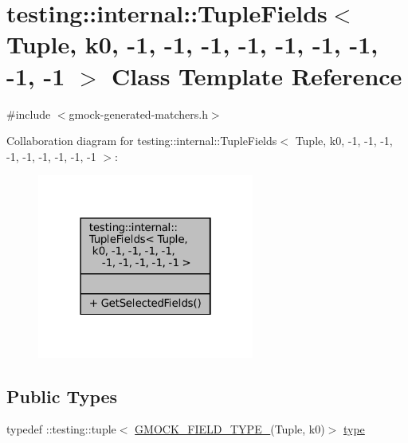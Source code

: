 \hypertarget{classtesting_1_1internal_1_1TupleFields_3_01Tuple_00_01k0_00_01-1_00_01-1_00_01-1_00_01-1_00_01-d80da5b2d6dff94ddefe7f2fc2de778d}{}\section{testing\+:\+:internal\+:\+:Tuple\+Fields$<$ Tuple, k0, -\/1, -\/1, -\/1, -\/1, -\/1, -\/1, -\/1, -\/1, -\/1 $>$ Class Template Reference}
\label{classtesting_1_1internal_1_1TupleFields_3_01Tuple_00_01k0_00_01-1_00_01-1_00_01-1_00_01-1_00_01-d80da5b2d6dff94ddefe7f2fc2de778d}


{\ttfamily \#include $<$gmock-\/generated-\/matchers.\+h$>$}



Collaboration diagram for testing\+:\+:internal\+:\+:Tuple\+Fields$<$ Tuple, k0, -\/1, -\/1, -\/1, -\/1, -\/1, -\/1, -\/1, -\/1, -\/1 $>$\+:
\nopagebreak
\begin{figure}[H]
\begin{center}
\leavevmode
\includegraphics[width=202pt]{classtesting_1_1internal_1_1TupleFields_3_01Tuple_00_01k0_00_01-1_00_01-1_00_01-1_00_01-1_00_01-b04745fc0fe5a3c04ff0649459ef874f}
\end{center}
\end{figure}
\subsection*{Public Types}
\begin{DoxyCompactItemize}
\item 
typedef \+::testing\+::tuple$<$ \hyperlink{gmock-generated-matchers_8h_acf3e27de83a73f0d873da1cd471e505b}{G\+M\+O\+C\+K\+\_\+\+F\+I\+E\+L\+D\+\_\+\+T\+Y\+P\+E\+\_\+}(Tuple, k0)$>$ \hyperlink{classtesting_1_1internal_1_1TupleFields_3_01Tuple_00_01k0_00_01-1_00_01-1_00_01-1_00_01-1_00_01-d80da5b2d6dff94ddefe7f2fc2de778d_aeb08130cf9faa6f43e0453d2c6d9fd04}{type}
\end{DoxyCompactItemize}
